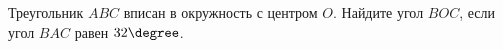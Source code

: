 \begin{ex}
	\begin{condition}
		Треугольник \( ABC \)  вписан в окружность с центром \( O \). Найдите угол \( BOC \), если угол \( BAC  \) равен \( 32\degree\).
	\end{condition}
\end{ex}